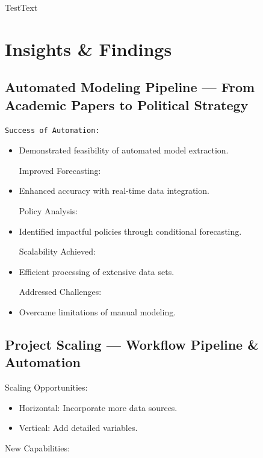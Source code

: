 \documentclass[
  letterpaper,
]{book}
\providecommand{\tightlist}{%
  \setlength{\itemsep}{0pt}\setlength{\parskip}{0pt}}
\begin{document}
TestText


\chapter{Insights \& Findings}\label{insights-findings}

\section{Automated Modeling Pipeline --- From Academic Papers to
Political
Strategy}\label{automated-modeling-pipeline-from-academic-papers-to-political-strategy}

\begin{verbatim}
Success of Automation:
\end{verbatim}

\begin{itemize}
\item
  Demonstrated feasibility of automated model extraction.

  Improved Forecasting:
\item
  Enhanced accuracy with real-time data integration.

  Policy Analysis:
\item
  Identified impactful policies through conditional forecasting.

  Scalability Achieved:
\item
  Efficient processing of extensive data sets.

  Addressed Challenges:
\item
  Overcame limitations of manual modeling.
\end{itemize}

\section{Project Scaling --- Workflow Pipeline \&
Automation}\label{project-scaling-workflow-pipeline-automation}

Scaling Opportunities:

\begin{itemize}
\tightlist
\item
  Horizontal: Incorporate more data sources.\\
\item
  Vertical: Add detailed variables.
\end{itemize}

New Capabilities:
\end{document}
